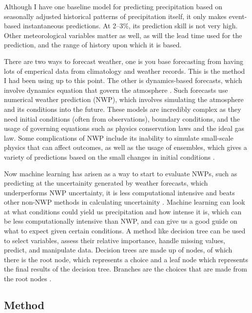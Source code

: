 \documentclass[11pt]{report}
\begin{document}
Although I have one baseline model for predicting precipitation based on
seasonally adjusted historical patterns of precipitation itself, it only
makes event-based instantaneous predictions.  At 2--3\%, its prediction
skill is not very high. Other meteorological variables matter as well, as
will the lead time used for the prediction, and the range of history upon
which it is based.

There are two ways to forecast weather, one is you base forecasting from having lots of emperical data from climatology and weather records. This is the method I had been using up to this point. The other is  dynamics-based forecasts, which involve dynamics equation that govern the atmosphere \cite[]{WF}. Such forecasts use numerical weather prediction (NWP), which involves simulating the atmosphere and its conditions into the future. These models are incredibly complex as they need initial conditions
(often from observations), boundary conditions, and the usage of governing
equations such as physics conservation laws and the ideal gas law. Some
complications of NWP include its inability to simulate small-scale physics
that can affect outcomes, as well as the usage of ensembles, which gives a
variety of predictions based on the small changes in initial conditions
\cite[]{NWP}. 

Now machine learning has arisen as a way to start to evaluate NWPs, such as
predicting at the uncertainity generated by weather forecasts, which 
underperforms NWP uncertainty, it is less computational intensive and beats
other non-NWP methods in calculating uncertainity \cite[]{Scher}.
Machine learning can look at what conditions could yield us precipitation
and how intense it is, which can be less computationally intensive than NWP,
and can give us a good guide on what to expect given certain
conditions.  A method like decision tree can be used to select variables,
assess their relative importance, handle missing values, predict, and
manipulate data. Decision trees are made up of nodes, of which there is the
root node, which represents a choice and a leaf node which represents the
final results of the decision tree. Branches are the choices that are made
from the root nodes \cite[]{DT}.


\subsection{Method}
\end{document}
